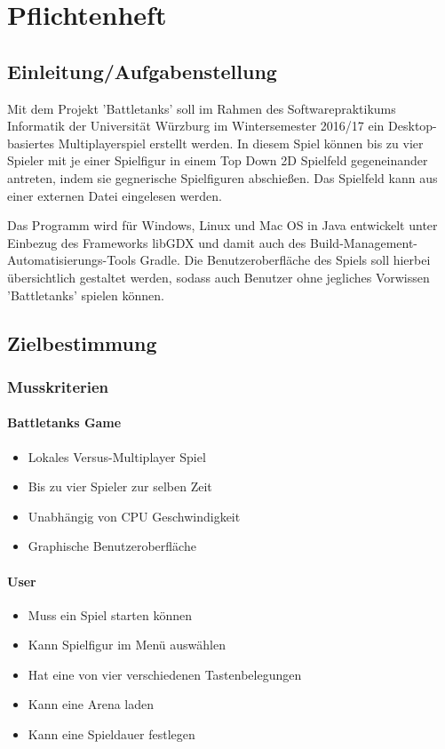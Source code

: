 \chapter{Pflichtenheft}
\section{Einleitung/Aufgabenstellung}
Mit dem Projekt 'Battletanks' soll im Rahmen des Softwarepraktikums Informatik der Universität Würzburg im Wintersemester 2016/17 ein Desktop-basiertes Multiplayerspiel erstellt werden.
In diesem Spiel können bis zu vier Spieler mit je einer Spielfigur in einem Top Down 2D Spielfeld gegeneinander antreten, indem sie gegnerische Spielfiguren abschießen.
Das Spielfeld kann aus einer externen Datei eingelesen werden.

Das Programm wird für Windows, Linux und Mac OS in Java entwickelt unter Einbezug des Frameworks libGDX und damit auch des Build-Management-Automatisierungs-Tools Gradle.
Die Benutzeroberfläche des Spiels soll hierbei übersichtlich gestaltet werden, sodass auch Benutzer ohne jegliches Vorwissen 'Battletanks' spielen können.

\section{Zielbestimmung}
\subsection{Musskriterien}
\subsubsection{Battletanks Game}
\begin{itemize}
\item Lokales Versus-Multiplayer Spiel
\item Bis zu vier Spieler zur selben Zeit
\item Unabhängig von CPU Geschwindigkeit
\item Graphische Benutzeroberfläche
\end{itemize}
\subsubsection{User}
\begin{itemize}
\item Muss ein Spiel starten können
\item Kann Spielfigur im Menü auswählen
\item Hat eine von vier verschiedenen Tastenbelegungen
\item Kann eine Arena laden
\item Kann eine Spieldauer festlegen

\end{itemize}
